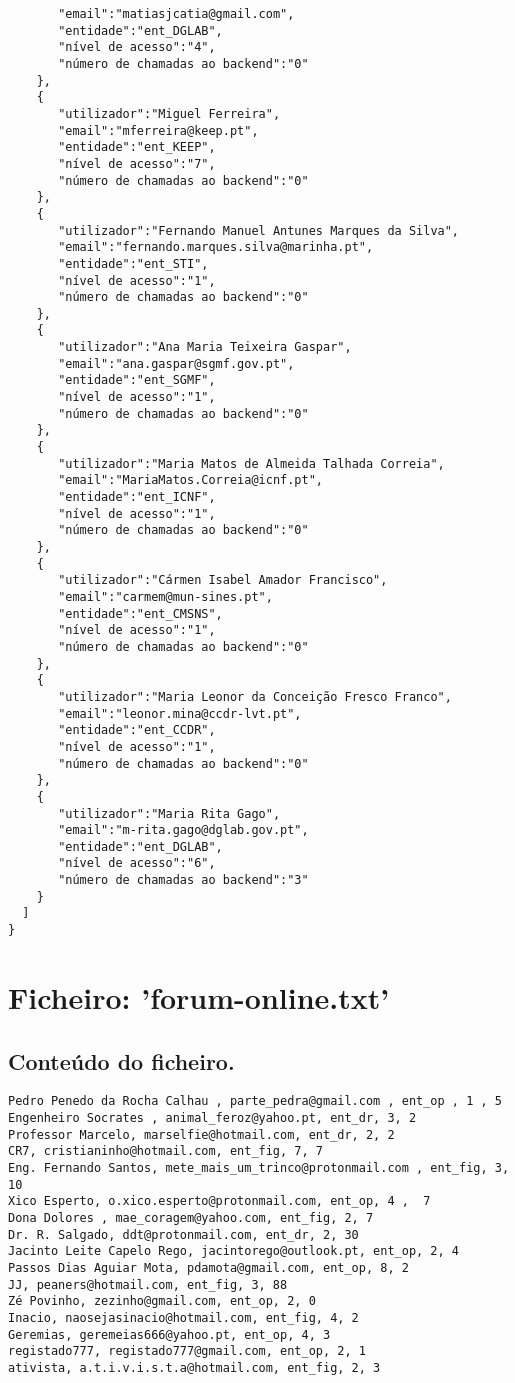 \documentclass[11pt,a4paper]{report}%
\begin{document}
\begin{verbatim}
       "email":"matiasjcatia@gmail.com",
       "entidade":"ent_DGLAB",
       "nível de acesso":"4",
       "número de chamadas ao backend":"0"
    },
    {
       "utilizador":"Miguel Ferreira",
       "email":"mferreira@keep.pt",
       "entidade":"ent_KEEP",
       "nível de acesso":"7",
       "número de chamadas ao backend":"0"
    },
    {
       "utilizador":"Fernando Manuel Antunes Marques da Silva",
       "email":"fernando.marques.silva@marinha.pt",
       "entidade":"ent_STI",
       "nível de acesso":"1",
       "número de chamadas ao backend":"0"
    },
    {
       "utilizador":"Ana Maria Teixeira Gaspar",
       "email":"ana.gaspar@sgmf.gov.pt",
       "entidade":"ent_SGMF",
       "nível de acesso":"1",
       "número de chamadas ao backend":"0"
    },
    {
       "utilizador":"Maria Matos de Almeida Talhada Correia",
       "email":"MariaMatos.Correia@icnf.pt",
       "entidade":"ent_ICNF",
       "nível de acesso":"1",
       "número de chamadas ao backend":"0"
    },
    {
       "utilizador":"Cármen Isabel Amador Francisco",
       "email":"carmem@mun-sines.pt",
       "entidade":"ent_CMSNS",
       "nível de acesso":"1",
       "número de chamadas ao backend":"0"
    },
    {
       "utilizador":"Maria Leonor da Conceição Fresco Franco",
       "email":"leonor.mina@ccdr-lvt.pt",
       "entidade":"ent_CCDR",
       "nível de acesso":"1",
       "número de chamadas ao backend":"0"
    },
    {
       "utilizador":"Maria Rita Gago",
       "email":"m-rita.gago@dglab.gov.pt",
       "entidade":"ent_DGLAB",
       "nível de acesso":"6",
       "número de chamadas ao backend":"3"
    }
  ]
}

\end{verbatim}


\section{Ficheiro: 'forum-online.txt'}
\subsection{Conteúdo do ficheiro.}

\begin{verbatim}
Pedro Penedo da Rocha Calhau , parte_pedra@gmail.com , ent_op , 1 , 5
Engenheiro Socrates , animal_feroz@yahoo.pt, ent_dr, 3, 2
Professor Marcelo, marselfie@hotmail.com, ent_dr, 2, 2
CR7, cristianinho@hotmail.com, ent_fig, 7, 7
Eng. Fernando Santos, mete_mais_um_trinco@protonmail.com , ent_fig, 3, 10
Xico Esperto, o.xico.esperto@protonmail.com, ent_op, 4 ,  7
Dona Dolores , mae_coragem@yahoo.com, ent_fig, 2, 7
Dr. R. Salgado, ddt@protonmail.com, ent_dr, 2, 30
Jacinto Leite Capelo Rego, jacintorego@outlook.pt, ent_op, 2, 4
Passos Dias Aguiar Mota, pdamota@gmail.com, ent_op, 8, 2
JJ, peaners@hotmail.com, ent_fig, 3, 88
Zé Povinho, zezinho@gmail.com, ent_op, 2, 0
Inacio, naosejasinacio@hotmail.com, ent_fig, 4, 2
Geremias, geremeias666@yahoo.pt, ent_op, 4, 3
registado777, registado777@gmail.com, ent_op, 2, 1
ativista, a.t.i.v.i.s.t.a@hotmail.com, ent_fig, 2, 3  
\end{verbatim}
\end{document}

